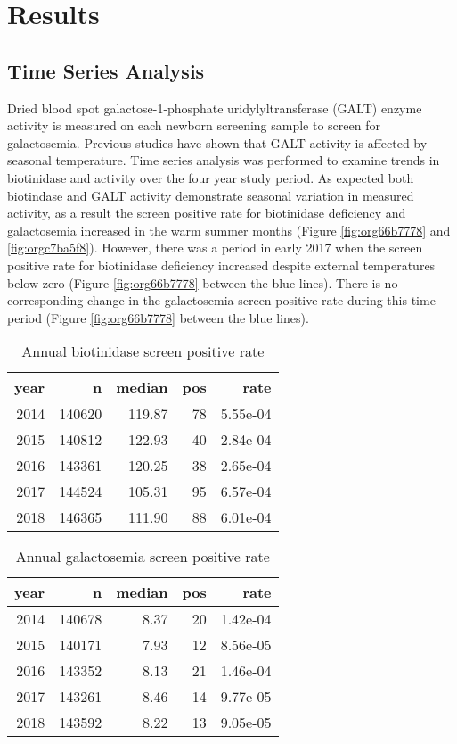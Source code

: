 \documentclass[review]{elsarticle}
\begin{document}
\section*{Results}
\label{sec:org0d724a5}
\subsection*{Time Series Analysis}
\label{sec:org39df2c8}
Dried blood spot galactose-1-phosphate uridylyltransferase (GALT)
enzyme activity is measured on each newborn screening sample to screen
for galactosemia. Previous studies have shown that GALT activity is
affected by seasonal temperature. Time series analysis was performed
to examine trends in biotinidase and activity over the four year study
period. As expected both biotindase and GALT activity demonstrate
seasonal variation in measured activity, as a result the screen
positive rate for biotinidase deficiency and galactosemia increased in
the warm summer months (Figure \ref{fig:org66b7778} and \ref{fig:orgc7ba5f8}). However,
there was a period in early 2017 when the screen positive rate for
biotinidase deficiency increased despite external temperatures below
zero (Figure \ref{fig:org66b7778} between the blue lines). There is no
corresponding change in the galactosemia screen positive rate during
this time period (Figure \ref{fig:org66b7778} between the blue lines).

\begin{table}[ht]
\centering
\begin{tabular}{rrrrr}
  \hline
year & n & median & pos & rate \\ 
  \hline
2014 & 140620 & 119.87 &  78 & 5.55e-04 \\ 
  2015 & 140812 & 122.93 &  40 & 2.84e-04 \\ 
  2016 & 143361 & 120.25 &  38 & 2.65e-04 \\ 
  2017 & 144524 & 105.31 &  95 & 6.57e-04 \\ 
  2018 & 146365 & 111.90 &  88 & 6.01e-04 \\ 
   \hline
\end{tabular}
\caption{Annual biotinidase screen positive rate} 
\label{tab:biot_year}
\end{table}

\begin{table}[ht]
\centering
\begin{tabular}{rrrrr}
  \hline
year & n & median & pos & rate \\ 
  \hline
2014 & 140678 & 8.37 &  20 & 1.42e-04 \\ 
  2015 & 140171 & 7.93 &  12 & 8.56e-05 \\ 
  2016 & 143352 & 8.13 &  21 & 1.46e-04 \\ 
  2017 & 143261 & 8.46 &  14 & 9.77e-05 \\ 
  2018 & 143592 & 8.22 &  13 & 9.05e-05 \\ 
   \hline
\end{tabular}
\caption{Annual galactosemia screen positive rate} 
\label{tab:galt_year}
\end{table}
\end{document}
